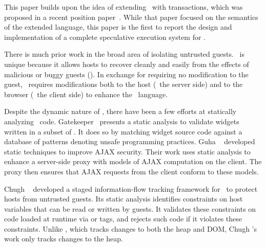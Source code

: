 \label{section:relatedwork}

This paper builds upon the idea of extending \js\ with transactions, which was
proposed in a recent position paper~\cite{plas10}.  While that paper focused on
the semantics of the extended language, this paper is the first to report the
design and implementation of a complete speculative execution system for \js.

There is much prior work in the broad area of isolating untrusted guests.
\txjs\ is unique because it allows hosts to recover cleanly and easily from the
effects of malicious or buggy guests (). In exchange
for requiring no modification to the guest, \txjs\ requires modifications both
to the host (\ie~the server side) and to the browser (\ie~the client side) to
enhance the \js\ language.

%
Despite the dynamic nature of \js, there have been a few efforts at statically
analyzing \js\ code. Gatekeeper~\cite{gatekeeper:sec09} presents a static
analysis to validate widgets written in a subset of \js. It does so by matching
widget source code against a database of patterns denoting unsafe programming
practices.
  Guha \etal~\cite{guha} developed static techniques to improve AJAX
security. Their work uses static analysis to enhance a server-side proxy with
models of AJAX computation on the client. The proxy then ensures that AJAX
requests from the client conform to these models. 

Chugh \etal~\cite{stagedif:pldi09} developed a staged information-flow tracking
framework for \js\ to protect hosts from untrusted guests. Its static analysis
identifies constraints on host variables that can be read or written by guests.
It validates these constraints on code loaded at runtime via  or
 tags, and rejects such code if it violates these constraints. 
Unlike \txjs, which tracks changes to both the heap and DOM, Chugh \etal's work
only tracks changes to the heap.

